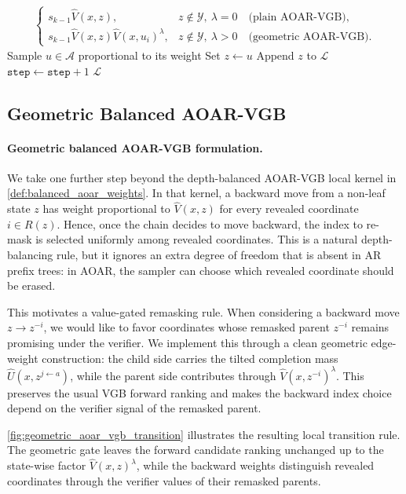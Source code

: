 \documentclass{article}
\numberwithin{theorem}{section}
\numberwithin{proposition}{section}
\numberwithin{corollary}{section}
\numberwithin{lemma}{section}
\numberwithin{conjecture}{section}
\numberwithin{remark}{section}
\numberwithin{definition}{section}
\numberwithin{assumption}{section}
\numberwithin{example}{section}
\newcommand{\calY}{{\mathcal{Y}}}
\begin{document}
\begin{algorithm}[t]
\begin{algorithmic}[1]
{{\begin{align*}
\begin{cases}
                s_{k-1}\widehat V(x,z),
                    & z\notin\calY,\ \lambda=0 \quad \text{(plain AOAR-VGB)},\\
                s_{k-1}\widehat V(x,z)\widehat V(x,u_i)^\lambda,
                    & z\notin\calY,\ \lambda>0 \quad \text{(geometric AOAR-VGB)}.
            \end{cases}
        \end{align*}}}
    \EndIf
    \State Sample $u\in\mathcal A$ proportional to its weight
    \State Set $z\gets u$
    \If{$z\in\calY$}
        \State Append $z$ to $\mathcal L$
    \EndIf
    \State $\texttt{step}\gets\texttt{step}+1$
\EndWhile
\State \Return $\mathcal L$
\end{algorithmic}
\end{algorithm}
\fi


\subsection{Geometric Balanced AOAR-VGB}
\label{app:subsec:balanced_geometric_aoar_vgb}

\paragraph{Geometric balanced AOAR-VGB formulation.}
We take one further step beyond the depth-balanced AOAR-VGB local kernel in \cref{def:balanced_aoar_weights}. In that kernel, a backward move from a non-leaf state $z$ has weight proportional to $\widehat V(x,z)$ for every revealed coordinate $i\in R(z)$. Hence, once the chain decides to move backward, the index to re-mask is selected uniformly among revealed coordinates. This is a natural depth-balancing rule, but it ignores an extra degree of freedom that is absent in AR prefix trees: in AOAR, the sampler can choose which revealed coordinate should be erased.

This motivates a value-gated remasking rule. When considering a backward move $z\to z^{-i}$, we would like to favor coordinates whose remasked parent $z^{-i}$ remains promising under the verifier. We implement this through a clean geometric edge-weight construction: the child side carries the tilted completion mass $\widehat U(x,z^{j \leftarrow a})$, while the parent side contributes through $\widehat V(x,z^{-i})^\lambda$. This preserves the usual VGB forward ranking and makes the backward index choice depend on the verifier signal of the remasked parent.

\cref{fig:geometric_aoar_vgb_transition} illustrates the resulting local transition rule. The geometric gate leaves the forward candidate ranking unchanged up to the state-wise factor $\widehat V(x,z)^\lambda$, while the backward weights distinguish revealed coordinates through the verifier values of their remasked parents.
\end{document}
